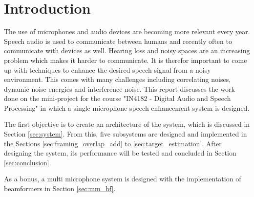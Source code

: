 \section{Introduction} \label{sec:introduction}
The use of microphones and audio devices are becoming more relevant every year. Speech audio is used to communicate between humans and recently often to communicate with devices as well. Hearing loss and noisy spaces are an increasing problem which makes it harder to communicate. It is therefor important to come up with techniques to enhance the desired speech signal from a noisy environment. This comes with many challenges including correlating noises, dynamic noise energies and interference noise. This report discusses the work done on the mini-project for the course "IN4182 - Digital Audio and Speech Processing" in which a single microphone speech enhancement system is designed.

The first objective is to create an architecture of the system, which is discussed in Section \ref{sec:system}. From this, five subsystems are designed and implemented in the Sections \ref{sec:framing_overlap_add} to \ref{sec:target_estimation}. After designing the system, its performance will be tested and concluded in Section \ref{sec:conclusion}.

As a bonus, a multi microphone system is designed with the implementation of beamformers in Section \ref{sec:mm_bf}.
